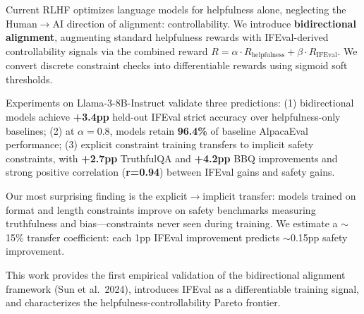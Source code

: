Current RLHF optimizes language models for helpfulness alone, neglecting the Human$\rightarrow$AI direction of alignment: controllability. We introduce \textbf{bidirectional alignment}, augmenting standard helpfulness rewards with IFEval-derived controllability signals via the combined reward $R = \alpha \cdot R_{\text{helpfulness}} + \beta \cdot R_{\text{IFEval}}$. We convert discrete constraint checks into differentiable rewards using sigmoid soft thresholds.

Experiments on Llama-3-8B-Instruct validate three predictions: (1) bidirectional models achieve \textbf{+3.4pp} held-out IFEval strict accuracy over helpfulness-only baselines; (2) at $\alpha=0.8$, models retain \textbf{96.4\%} of baseline AlpacaEval performance; (3) explicit constraint training transfers to implicit safety constraints, with \textbf{+2.7pp} TruthfulQA and \textbf{+4.2pp} BBQ improvements and strong positive correlation (\textbf{r=0.94}) between IFEval gains and safety gains.

Our most surprising finding is the explicit$\rightarrow$implicit transfer: models trained on format and length constraints improve on safety benchmarks measuring truthfulness and bias---constraints never seen during training. We estimate a $\sim$15\% transfer coefficient: each 1pp IFEval improvement predicts $\sim$0.15pp safety improvement.

This work provides the first empirical validation of the bidirectional alignment framework (Sun et al.\ 2024), introduces IFEval as a differentiable training signal, and characterizes the helpfulness-controllability Pareto frontier.
